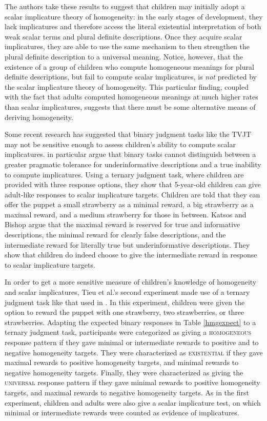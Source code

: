 \documentclass[12pt, letterpaper]{article}
\begin{document}
{The authors take these results to suggest that children may initially adopt a scalar implicature theory of homogeneity: in the early stages of development, they lack implicatures and therefore access the literal existential interpretation of both weak scalar terms and plural definite descriptions. Once they acquire scalar implicatures, they are able to use the same mechanism to then strengthen the plural definite description to a universal meaning. Notice, however, that the existence of a group of children who compute homogeneous meanings for plural definite descriptions, but fail to compute scalar implicatures, is \textit{not} predicted by the scalar implicature theory of homogeneity. This particular finding, coupled with the fact that adults computed homogeneous meanings at much higher rates than scalar implicatures, suggests that there must be some alternative means of deriving homogeneity.

Some recent research has suggested that binary judgment tasks like the TVJT may not be sensitive enough to assess children's ability to compute scalar implicatures. \cite*{Katsos:2011} in particular argue that binary tasks cannot distinguish between a greater pragmatic tolerance for underinformative descriptions and a true inability to compute implicatures. Using a ternary judgment task, where children are provided with three response options, they show that 5-year-old children can give adult-like responses to scalar implicature targets. Children are told that they can offer the puppet a small strawberry as a minimal reward, a big strawberry as a maximal reward, and a medium strawberry for those in between. Katsos and Bishop argue that the maximal reward is reserved for true and informative descriptions, the minimal reward for clearly false descriptions, and the intermediate reward for literally true but underinformative descriptions. They show that children do indeed choose to give the intermediate reward in response to scalar implicature targets.

In order to get a more sensitive measure of children's knowledge of homogeneity and scalar implicatures, Tieu et al.'s second experiment made use of a ternary judgment task like that used in \cite{Katsos:2011}. In this experiment, children were given the option to reward the puppet with one strawberry, two strawberries, or three strawberries. Adapting the expected binary responses in Table \ref{hmgexpect} to a ternary judgment task, participants were categorized as giving a \textsc{homogeneous} response pattern if they gave minimal or intermediate rewards to positive and to negative homogeneity targets. They were characterized as \textsc{existential} if they gave maximal rewards to positive homogeneity targets, and minimal rewards to negative homogeneity targets. Finally, they were characterized as giving the \textsc{universal} response pattern if they gave minimal rewards to positive homogeneity targets, and maximal rewards to negative homogeneity targets. As in the first experiment, children and adults were also give a scalar implicature test, on which minimal or intermediate rewards were counted as evidence of implicatures.

}
\end{document}
